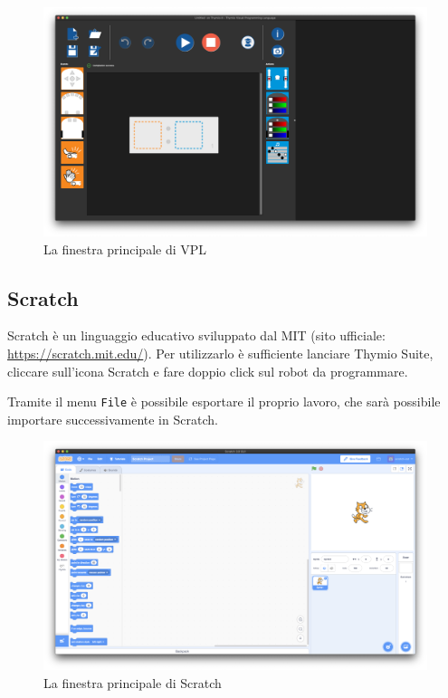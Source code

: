 \documentclass[12pt]{article}
\begin{document}
		\begin{figure}[H]
			\includegraphics[width=\textwidth]{img/vpl.png}
			\caption{La finestra principale di VPL}
			\label{main_vpl}
		\end{figure}
		
	\newpage
		
	\subsection{Scratch}
	
		Scratch è un linguaggio educativo sviluppato dal MIT (sito ufficiale: \url{https://scratch.mit.edu/}). Per utilizzarlo è sufficiente lanciare Thymio Suite, cliccare sull'icona Scratch e fare doppio click sul robot da programmare.
		
		Tramite il menu \texttt{File} è possibile esportare il proprio lavoro, che sarà possibile importare successivamente in Scratch.
		
		\begin{figure}[H]
			\includegraphics[width=\textwidth]{img/scratch.png}
			\caption{La finestra principale di Scratch}
			\label{main_scratch}
		\end{figure}
		
\end{document}
